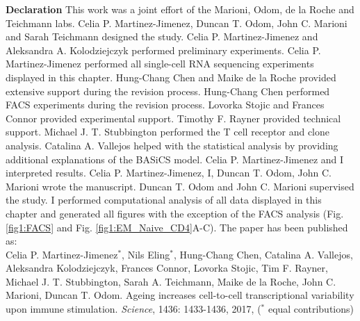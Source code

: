 \begin{Comment}
\textbf{Declaration} This work was a joint effort of the Marioni, Odom, de la Roche and Teichmann labs. Celia P. Martinez-Jimenez, Duncan T. Odom, John C. Marioni and Sarah Teichmann designed the study. Celia P. Martinez-Jimenez and Aleksandra A. Kolodziejczyk performed preliminary experiments. Celia P. Martinez-Jimenez performed all single-cell RNA sequencing experiments displayed in this chapter. Hung-Chang Chen and Maike de la Roche provided extensive support during the revision process. Hung-Chang Chen performed FACS experiments during the revision process. Lovorka Stojic and Frances Connor provided experimental support. Timothy F. Rayner provided technical support. Michael J. T. Stubbington performed the T cell receptor and clone analysis. Catalina A. Vallejos helped with the statistical analysis by providing additional explanations of the BASiCS model. Celia P. Martinez-Jimenez and I interpreted results. Celia P. Martinez-Jimenez, I, Duncan T. Odom, John C. Marioni wrote the manuscript. Duncan T. Odom and John C. Marioni supervised the study. I performed computational analysis of all data displayed in this chapter and generated all figures with the exception of the FACS analysis (Fig. \ref{fig1:FACS} and Fig. \ref{fig1:EM_Naive_CD4}A-C). The paper has been published as:\\

Celia P. Martinez-Jimenez$^\ast$, Nils  Eling$^\ast$, Hung-Chang Chen, Catalina A. Vallejos, Aleksandra Kolodziejczyk, Frances Connor, Lovorka Stojic, Tim F. Rayner, Michael J. T. Stubbington, Sarah A. Teichmann, Maike de la Roche, John C. Marioni, Duncan T. Odom. Ageing increases cell-to-cell transcriptional variability upon immune stimulation. \emph{Science}, 1436: 1433-1436, 2017, ($^\ast$ equal contributions)
\end{Comment}

\newpage


\newpage

